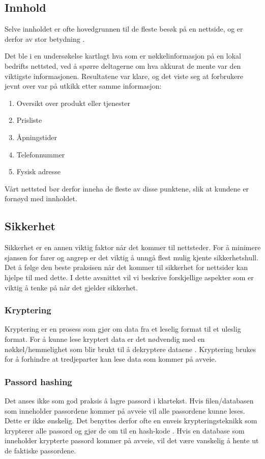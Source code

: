 \subsection{Innhold}
Selve innholdet er ofte hovedgrunnen til de fleste besøk på en nettside, og er derfor av stor betydning \cite{thielsch2014ueo}.

Det ble i en undersøkelse \cite{marchant18wdc} kartlagt hva som er nøkkelinformasjon på en lokal bedrifts nettsted, ved å spørre deltagerne om hva akkurat de mente var den viktigste informasjonen. Resultatene var klare, og det viste seg at forbrukere jevnt over var på utkikk etter samme informasjon:
\begin{enumerate}
\item Oversikt over produkt eller tjenester
\item Prisliste
\item Åpningstider
\item Telefonnummer
\item Fysisk adresse
\end{enumerate}

Vårt nettsted bør derfor inneha de fleste av disse punktene, slik at kundene er fornøyd med innholdet.

\subsection{Sikkerhet}
\label{sec:analysis-security}
Sikkerhet er en annen viktig faktor når det kommer til nettsteder. For å minimere sjansen for farer og angrep er det viktig å unngå flest mulig kjente sikkerhetshull. Det å følge den beste praksisen når det kommer til sikkerhet for nettsider kan hjelpe til med dette. I dette avsnittet vil vi beskrive forskjellige aspekter som er viktig å tenke på når det gjelder sikkerhet.
 
\subsubsection{Kryptering}
\label{sec:analysis-security-encryption}
Kryptering er en prosess som gjør om data fra et leselig format til et uleslig format. For å kunne lese kryptert data er det nødvendig med en nøkkel/hemmelighet som blir brukt til å dekryptere dataene \cite[s.~117-118]{NattTomHeine2015Datasikkerhet}. Kryptering brukes for å forhindre at tredjeparter kan lese data som kommer på avveie.
 
\subsubsection{Passord hashing}
\label{sec:analysis-security-password-hashing}
Det anses ikke som god praksis å lagre passord i klartekst. Hvis filen/databasen som inneholder passordene kommer på avveie vil alle passordene kunne leses. Dette er ikke ønskelig. Det benyttes derfor ofte en enveis krypteringsteknikk som krypterer alle passord og gjør de om til en hash-kode \cite[s.~100-103]{NattTomHeine2015Datasikkerhet}. Hvis en database som inneholder krypterte passord kommer på avveie, vil det være vanskelig å hente ut de faktiske passordene.
 
